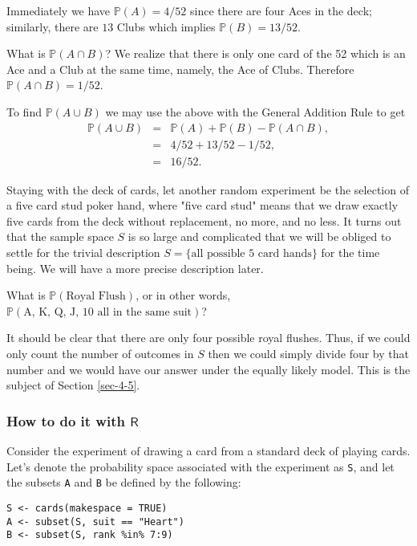 Immediately we have \(\mathbb{P}(A) = 4/52\) since there are four Aces
in the deck; similarly, there are \(13\) Clubs which implies
\(\mathbb{P}(B) = 13/52\).

What is \(\mathbb{P}(A\cap B)\)? We realize that there is only one
card of the 52 which is an Ace and a Club at the same time, namely,
the Ace of Clubs. Therefore \(\mathbb{P}(A\cap B)=1/52\).

To find \(\mathbb{P}(A\cup B)\) we may use the above with the General
Addition Rule to get
\begin{eqnarray*}
\mathbb{P}(A\cup B) & = & \mathbb{P}(A) + \mathbb{P}(B) - \mathbb{P}(A \cap B),\\
 & = & 4/52 + 13/52 - 1/52,\\
 & = & 16/52.
\end{eqnarray*}




Staying with the deck of cards, let another random experiment be the
selection of a five card stud poker hand, where "five card stud"
means that we draw exactly five cards from the deck without
replacement, no more, and no less. It turns out that the sample space
\(S\) is so large and complicated that we will be obliged to settle
for the trivial description \( S = \{ \mbox{all possible 5 card hands}
\} \) for the time being. We will have a more precise description
later.

What is \(\mathbb{P}(\mbox{Royal Flush})\), or in other words,
\(\mathbb{P}(\mbox{A, K, Q, J, 10 all in the same suit})\)?

It should be clear that there are only four possible royal
flushes. Thus, if we could only count the number of outcomes in \(S\)
then we could simply divide four by that number and we would have our
answer under the equally likely model. This is the subject of Section
\ref{sec-4-5}.

\subsubsection{How to do it with \(\mathsf{R}\)}
\label{sec-4-4-3-1}

Consider the experiment of drawing a card from a standard deck of
playing cards. Let's denote the probability space associated with the
experiment as \texttt{S}, and let the subsets \texttt{A} and \texttt{B} be defined by the
following:

\begin{Verbatim}
S <- cards(makespace = TRUE) 
A <- subset(S, suit == "Heart") 
B <- subset(S, rank %in% 7:9)
\end{Verbatim}

